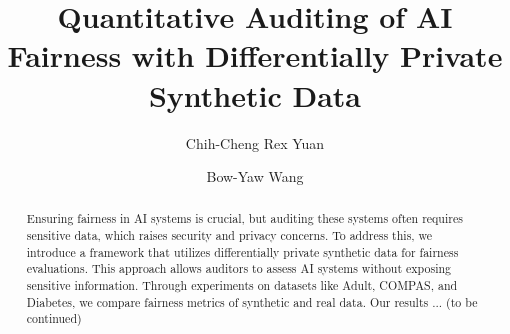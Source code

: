 \documentclass[manuscript,screen,review,anonymous]{acmart}
\begin{document}
\title{Quantitative Auditing of AI Fairness with Differentially Private Synthetic Data}

\author{Chih-Cheng Rex Yuan}

\author{Bow-Yaw Wang}


\begin{abstract}
Ensuring fairness in AI systems is crucial, but auditing these systems often requires sensitive data, which raises security and privacy concerns. To address this, we introduce a framework that utilizes differentially private synthetic data for fairness evaluations. This approach allows auditors to assess AI systems without exposing sensitive information. Through experiments on datasets like Adult, COMPAS, and Diabetes, we compare fairness metrics of synthetic and real data. Our results ... (to be continued)
\end{abstract}
\end{document}
